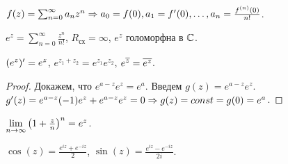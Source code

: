 \begin{note}
	$f(z) = \sum_{n = 0}^\infty a_n z^n \Rightarrow a_0 = f(0), a_1 = f'(0), \ldots, a_n = \frac{f^{(n)}(0)}{n!}$.
\end{note}

\begin{definition}
	$e^z = \sum_{n = 0}^\infty \frac{z^n}{n!}$, $R_\text{сх} = \infty$, $e^z$ голоморфна в $\mathbb{C}$.
\end{definition}

\begin{note}
	$\mathopen{}\left( e^z \right)\mathclose{}' = e^z$, $e^{z_1 + z_2} = e^{z_1} e^{z_2}$, $e^{\overline z} = \overline{e^z}$.
\end{note}
\begin{proof}
	Докажем, что $e^{a - z} e^{z} = e^a$. Введем $g(z) = e^{a - z} e^z$. $g'(z) = e^{a - z} (-1) e^z + e^{a - z} e^z = 0 \Rightarrow g(z) = const = g(0) = e^a$.
\end{proof}

\begin{note}
	$\lim\limits_{n \to \infty} {\mathopen{}\left( 1 + \frac{z}{n} \right)\mathclose{}}^n = e^z$.
\end{note}

\begin{definition}
	$\cos(z) = \frac{e^{iz} + e^{-iz}}{2}$, $\sin(z) = \frac{e^{iz} - e^{-iz}}{2i}$.
\end{definition}
